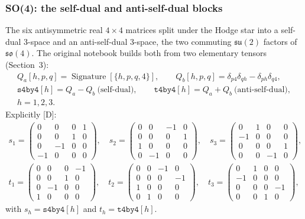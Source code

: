 \subsubsection{SO(4): the self-dual and anti-self-dual blocks}
\label{fnd:so4}\label{sec:3.1.3}

The six antisymmetric real $4\times4$ matrices split under the Hodge star into a self-dual
3-space and an anti-self-dual 3-space, the two commuting $\mathfrak{su}(2)$ factors of
$\mathfrak{so}(4)$. The original notebook builds both from two elementary tensors (Section~3):
\begin{gather}
  Q_a[h,p,q] = \operatorname{Signature}[\{h,p,q,4\}],\qquad
  Q_b[h,p,q] = \delta_{p4}\delta_{qh} - \delta_{ph}\delta_{q4},\\
  \texttt{s4by4}[h] = Q_a - Q_b \ \text{(self-dual)},\qquad
  \texttt{t4by4}[h] = Q_a + Q_b \ \text{(anti-self-dual)},\\
  h=1,2,3.
\end{gather}
Explicitly [D]:
\begin{gather*}
s_1=\left(\begin{smallmatrix}0&0&0&1\\0&0&1&0\\0&-1&0&0\\-1&0&0&0\end{smallmatrix}\right),\quad
s_2=\left(\begin{smallmatrix}0&0&-1&0\\0&0&0&1\\1&0&0&0\\0&-1&0&0\end{smallmatrix}\right),\quad
s_3=\left(\begin{smallmatrix}0&1&0&0\\-1&0&0&0\\0&0&0&1\\0&0&-1&0\end{smallmatrix}\right),\\
t_1=\left(\begin{smallmatrix}0&0&0&-1\\0&0&1&0\\0&-1&0&0\\1&0&0&0\end{smallmatrix}\right),\quad
t_2=\left(\begin{smallmatrix}0&0&-1&0\\0&0&0&-1\\1&0&0&0\\0&1&0&0\end{smallmatrix}\right),\quad
t_3=\left(\begin{smallmatrix}0&1&0&0\\-1&0&0&0\\0&0&0&-1\\0&0&1&0\end{smallmatrix}\right),
\end{gather*}
with $s_h = \texttt{s4by4}[h]$ and $t_h = \texttt{t4by4}[h]$.

